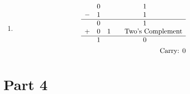 \documentclass[12pt letter]{report}
\begin{document}
{\begin{enumerate}
\begin{align*}
\begin{array}{c c c}
                & 1 & 1                         \\
              - & 1 & 1                         \\
              \hline
                & 1 & 1                         \\
              + & 0 & 1 \tag*{Two's Complement} \\
              \hline
                & 0 & 0
            \end{array} \\
            \text{Carry: 1}
          \end{align*}
    \item
          \begin{align*}
            \begin{array}{c c c}
                & 0 & 1                         \\
              - & 1 & 1                         \\
              \hline
                & 0 & 1                         \\
              + & 0 & 1 \tag*{Two's Complement} \\
              \hline
                & 1 & 0
            \end{array} \\
            \text{Carry: 0}
          \end{align*}
  \end{enumerate}
}

\section*{Part 4}

\end{document}
